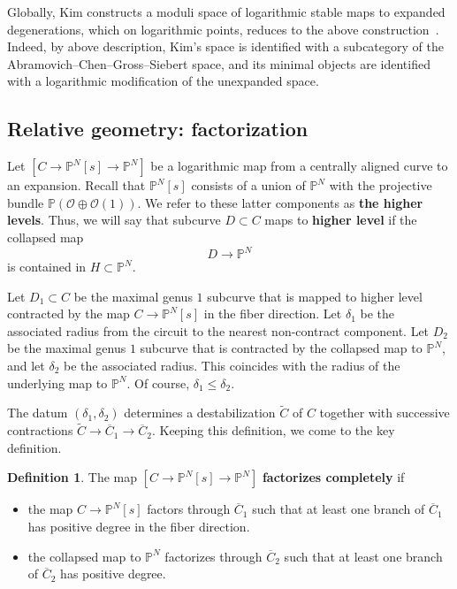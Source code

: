 \documentclass[11pt]{amsart}
\renewcommand{\to}{\rightarrow}
\theoremstyle{definition}
\theoremstyle{definition}
\newtheorem{definition}[thm]{Definition}
\begin{document}
Globally, Kim constructs a moduli space of logarithmic stable maps to expanded degenerations, which on logarithmic points, reduces to the above construction~\cite{KimLog}. Indeed, by above description, Kim's space is identified with a subcategory of the Abramovich--Chen--Gross--Siebert space, and its minimal objects are identified with a logarithmic modification of the unexpanded space.

\subsection{Relative geometry: factorization}\label{subsection factorisation} Let $[C\to \mathbb P^N[s]\to \mathbb P^N]$ be a logarithmic map from a centrally aligned curve to an expansion. Recall that $\mathbb P^N[s]$ consists of a union of $\mathbb P^N$ with the projective bundle $\mathbb P(\mathcal O\oplus \mathcal O(1))$. We refer to these latter components as \textbf{the higher levels}. Thus, we will say that subcurve $D\subset C$ maps to \textbf{higher level} if the collapsed map
\[
D\to \mathbb P^N
\]
is contained in $H\subset \mathbb P^N$. 

Let $D_1\subset C$ be the maximal genus $1$ subcurve that is mapped to higher level contracted by the map $C\to \mathbb P^N[s]$ in the fiber direction. Let $\delta_1$ be the associated radius from the circuit to the nearest non-contract component. Let $D_2$ be the maximal genus $1$ subcurve that is contracted by the collapsed map to $\mathbb P^N$, and let $\delta_2$ be the associated radius. This coincides with the radius of the underlying map to $\mathbb P^N$. Of course, $\delta_1\leq \delta_2$.

The datum $(\delta_1,\delta_2)$ determines a destabilization $\widetilde C$ of $C$ together with successive contractions $\widetilde C\to \overline C_1\to\overline C_2$. Keeping this definition, we come to the key definition.

\begin{definition}
The map $[C\to \mathbb P^N[s]\to \mathbb P^N]$ \textbf{factorizes completely} if
\begin{itemize}
\item the map $C\to \mathbb P^N[s]$ factors through $\overline C_1$ such that at least one branch of $\overline C_1$ has positive degree in the fiber direction. 
\item the collapsed map to $\mathbb P^N$ factorizes through $\overline C_2$ such that at least one branch of $\overline C_2$ has positive degree.
\end{itemize}
\end{definition}
\end{document}
